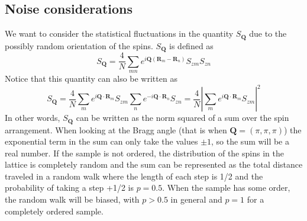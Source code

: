 \documentclass[11pt,letter]{article}
\newcommand{\bv}[1]{\ensuremath{\bm{#1}}}
\begin{document}
\newpage

\subsection{Noise considerations} 

We want to consider the statistical fluctuations in the quantity $S_{\bv{Q}}$
due to the possibly random orientation of the spins.  $S_{\bv{Q}}$ is defined
as 
\begin{equation}
S_{\bv{Q}} =  
      \frac{4}{N}
      \sum_{mn}  
      e^{ i \bv{Q}( \bv{R}_{m} - \bv{R}_{n} ) }  
      S_{zm}S_{zn}
\end{equation}
Notice that this quantity can also be written as 
\begin{equation}
S_{\bv{Q}} =  
      \frac{4}{N}
      \sum_{m}  
      e^{ i \bv{Q} \cdot\bv{R}_{m}  }  
      S_{zm} 
      \sum_{n}  
      e^{ -i \bv{Q} \cdot\bv{R}_{n}  }  
      S_{zn} =  
      \frac{4}{N}
      \left| \sum_{m}  
      e^{ i \bv{Q} \cdot \bv{R}_{m} }  
      S_{zm} \right|^{2}
\end{equation}
In other words, $S_{\bv{Q}}$ can be written as the norm squared of a sum over
the spin arrangement.   When looking at the Bragg angle  (that is when $\bv{Q}
= (\pi,\pi,\pi)$) the exponential term in the sum can only take the values
$\pm1$, so the sum will be a real number.  If the sample is not ordered, the
distribution of the spins in the lattice is completely random and the sum can
be represented as the total distance traveled in a random walk where the length
of each step is 1/2 and the probability of taking a step +1/2 is  $p=0.5$.
When the sample has some order, the random walk will be biased,  with $p>0.5$
in general and $p=1$ for a completely ordered sample.
\end{document}
